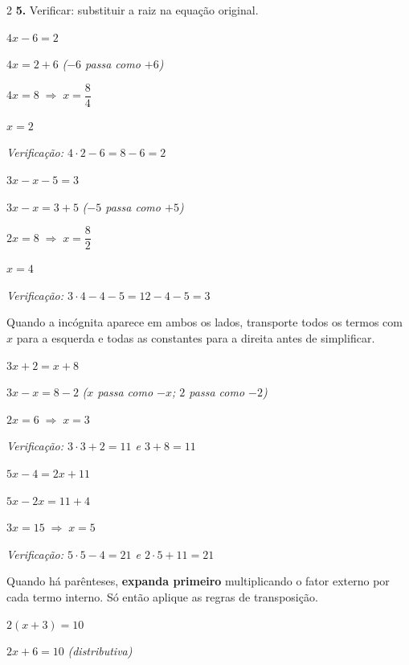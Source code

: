 \documentclass[12pt]{article}
\begin{document}
\begin{multicols}{2}
\textbf{5.} Verificar: substituir a raiz na equação original.


 $4x - 6 = 2$

$4x = 2 + 6$ \hfill {\small\textit{($-6$ passa como $+6$)}}

$4x = 8 \;\Rightarrow\; x = \dfrac{8}{4}$

$x = 2$

\textit{Verificação: $4\cdot2 - 6 = 8 - 6 = 2$ \checkmark}

\vspace{6pt}

 $3x - x - 5 = 3$

$3x - x = 3 + 5$ \hfill {\small\textit{($-5$ passa como $+5$)}}

$2x = 8 \;\Rightarrow\; x = \dfrac{8}{2}$

$x = 4$

\textit{Verificação: $3\cdot4 - 4 - 5 = 12 - 4 - 5 = 3$ \checkmark}


Quando a incógnita aparece em ambos os lados, transporte todos os termos com $x$ para a esquerda e todas as constantes para a direita antes de simplificar.

 $3x + 2 = x + 8$

$3x - x = 8 - 2$ \hfill {\small\textit{($x$ passa como $-x$; $2$ passa como $-2$)}}

$2x = 6 \;\Rightarrow\; x = 3$

\textit{Verificação: $3\cdot3+2=11$ e $3+8=11$ \checkmark}

\vspace{6pt}

 $5x - 4 = 2x + 11$

$5x - 2x = 11 + 4$

$3x = 15 \;\Rightarrow\; x = 5$

\textit{Verificação: $5\cdot5-4=21$ e $2\cdot5+11=21$ \checkmark}


Quando há parênteses, \textbf{expanda primeiro} multiplicando o fator externo por cada termo interno. Só então aplique as regras de transposição.

 $2(x + 3) = 10$

$2x + 6 = 10$ \hfill {\small\textit{(distributiva)}}


\end{multicols}
\end{document}
